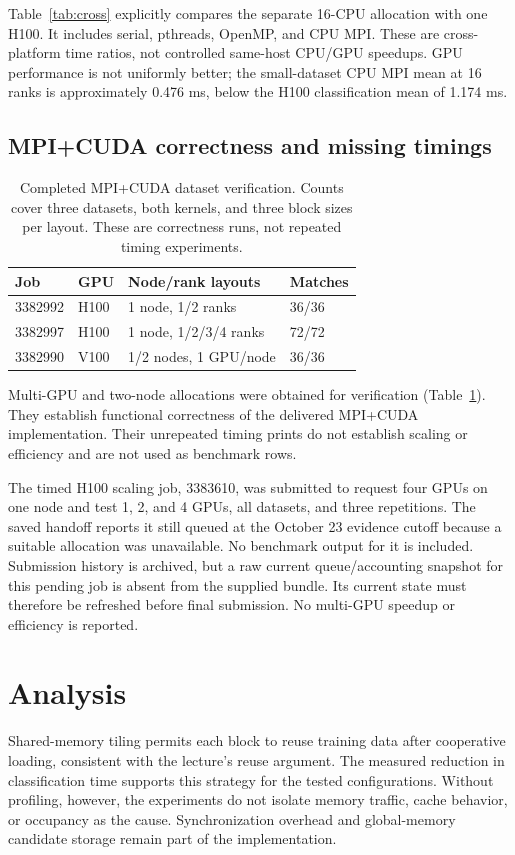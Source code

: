 \documentclass[conference]{IEEEtran}
\begin{document}
Table~\ref{tab:cross} explicitly compares the separate 16-CPU allocation with one H100. It includes serial, pthreads, OpenMP, and CPU MPI. These are cross-platform time ratios, not controlled same-host CPU/GPU speedups. GPU performance is not uniformly better; the small-dataset CPU MPI mean at 16 ranks is approximately 0.476 ms, below the H100 classification mean of 1.174 ms.

\subsection{MPI+CUDA correctness and missing timings}
\begin{table}[t]\centering
\caption{Completed MPI+CUDA dataset verification. Counts cover three datasets, both kernels, and three block sizes per layout. These are correctness runs, not repeated timing experiments.}\label{tab:mpi}
\small\begin{tabular}{llll}\toprule
Job & GPU & Node/rank layouts & Matches\\\midrule
3382992 & H100 & 1 node, 1/2 ranks & 36/36\\
3382997 & H100 & 1 node, 1/2/3/4 ranks & 72/72\\
3382990 & V100 & 1/2 nodes, 1 GPU/node & 36/36\\\bottomrule
\end{tabular}\end{table}
Multi-GPU and two-node allocations were obtained for verification (Table~\ref{tab:mpi}). They establish functional correctness of the delivered MPI+CUDA implementation. Their unrepeated timing prints do not establish scaling or efficiency and are not used as benchmark rows.

The timed H100 scaling job, 3383610, was submitted to request four GPUs on one node and test 1, 2, and 4 GPUs, all datasets, and three repetitions. The saved handoff reports it still queued at the October 23 evidence cutoff because a suitable allocation was unavailable. No benchmark output for it is included. Submission history is archived, but a raw current queue/accounting snapshot for this pending job is absent from the supplied bundle. Its current state must therefore be refreshed before final submission. No multi-GPU speedup or efficiency is reported.

\section{Analysis}
Shared-memory tiling permits each block to reuse training data after cooperative loading, consistent with the lecture's reuse argument. The measured reduction in classification time supports this strategy for the tested configurations. Without profiling, however, the experiments do not isolate memory traffic, cache behavior, or occupancy as the cause. Synchronization overhead and global-memory candidate storage remain part of the implementation.
\end{document}
